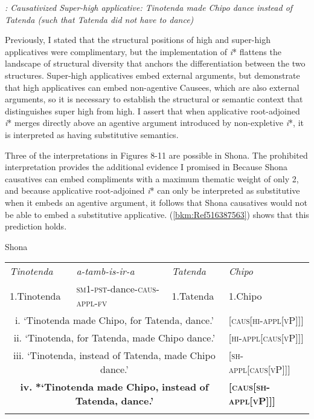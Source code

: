 \documentclass[output=paper,modfonts,nonflat]{langsci/langscibook}
\begin{document}
  
 



\textit{: Causativized Super-high applicative: Tinotenda made Chipo dance instead of Tatenda (such that Tatenda did not have to dance)}



Previously, I stated that the structural positions of high and super-high applicatives were complimentary, but the implementation of \textit{i}* flattens the landscape of structural diversity that anchors the differentiation between the two structures. Super-high applicatives embed external arguments, but  demonstrate that high applicatives can embed non-agentive Causees, which are also external arguments, so it is necessary to establish the structural or semantic context that distinguishes super high from high. I assert that when applicative root-adjoined \textit{i}* merges directly above an agentive argument introduced by non-expletive \textit{i}*, it is interpreted as having substitutive semantics. 



Three of the interpretations in Figures 8-11 are possible in Shona. The prohibited interpretation provides the additional evidence I promised in  Because Shona causatives can embed compliments with a maximum thematic weight of only 2, and because applicative root-adjoined \textit{i}* can only be interpreted as substitutive when it embeds an agentive argument, it follows that Shona causatives would not be able to embed a substitutive applicative. (\ref{bkm:Ref516387563}) shows that this prediction holds. 



Shona


\begin{tabularx}{\textwidth}{XXXX}
\lsptoprule
{\itshape Tinotenda}  & \textit{a-tamb-is-ir-a}                                                                      & \textit{Tatenda} & {\itshape Chipo}\\
1.Tinotenda & \textsc{sm1-pst}{}-dance-\textsc{caus-appl-fv} & 1.Tatenda & 1.Chipo\\
\multicolumn{3}{c}{i. ‘Tinotenda made Chipo, for Tatenda, dance.’}  & \textsc{[caus[hi-appl[vP]]]}\\
\multicolumn{3}{c}{ii. ‘Tinotenda, for Tatenda, made Chipo dance.’} & \textsc{[hi-appl[caus[vP]]]}\\
\multicolumn{3}{c}{iii. ‘Tinotenda, instead of Tatenda, made Chipo dance.’} & \textsc{[sh-appl[caus[vP]]]}\\
\multicolumn{3}{c}{\textbf{iv.} \textbf{*‘Tinotenda} \textbf{made} \textbf{Chipo,} \textbf{instead} \textbf{of} \textbf{Tatenda,} \textbf{dance.’}} & \textbf{\textsc{[caus[sh-appl[vP]]]}}\\
\lspbottomrule
\end{tabularx}
\end{document}
